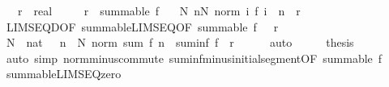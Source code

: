 \begin{isabellebody}
\ \ \ r\ {\isacharcolon}{\kern0pt}{\isacharcolon}{\kern0pt}\ real\isanewline
\ \ \ {\isachardoublequoteopen}{}\ {\isacharless}{\kern0pt}\ r{\isachardoublequoteclose}\ \ {\isachardoublequoteopen}summable\ f{\isachardoublequoteclose}\isanewline
\ \ \ {\isachardoublequoteopen}{\isasymexists}N{\isachardot}{\kern0pt}\ {\isasymforall}n{\isasymge}N{\isachardot}{\kern0pt}\ norm\ {\isacharparenleft}{\kern0pt}{\isasymSum}i{\isachardot}{\kern0pt}\ f\ {\isacharparenleft}{\kern0pt}i\ {\isacharplus}{\kern0pt}\ n{\isacharparenright}{\kern0pt}{\isacharparenright}{\kern0pt}\ {\isacharless}{\kern0pt}\ r{\isachardoublequoteclose}\isanewline
%
\isadelimproof
%
\endisadelimproof
%
\isatagproof
{}\isamarkupfalse%
\ {\isacharminus}{\kern0pt}\isanewline
\ \ \isamarkupfalse%
\ LIMSEQ{\isacharunderscore}{\kern0pt}D{\isacharbrackleft}{\kern0pt}OF\ summable{\isacharunderscore}{\kern0pt}LIMSEQ{\isacharbrackleft}{\kern0pt}OF\ {\isacartoucheopen}summable\ f{\isacartoucheclose}{\isacharbrackright}{\kern0pt}\ {\isacartoucheopen}{}\ {\isacharless}{\kern0pt}\ r{\isacartoucheclose}{\isacharbrackright}{\kern0pt}\isanewline
\ \ \isamarkupfalse%
\ N\ {\isacharcolon}{\kern0pt}{\isacharcolon}{\kern0pt}\ nat\ \ {\isachardoublequoteopen}{\isasymforall}\ n\ {\isasymge}\ N{\isachardot}{\kern0pt}\ norm\ {\isacharparenleft}{\kern0pt}sum\ f\ {\isacharbraceleft}{\kern0pt}{\isachardot}{\kern0pt}{\isachardot}{\kern0pt}{\isacharless}{\kern0pt}n{\isacharbraceright}{\kern0pt}\ {\isacharminus}{\kern0pt}\ suminf\ f{\isacharparenright}{\kern0pt}\ {\isacharless}{\kern0pt}\ r{\isachardoublequoteclose}\isanewline
\ \ \ \ \isamarkupfalse%
\ auto\isanewline
\ \ \isamarkupfalse%
\ \isamarkupfalse%
\ {\isacharquery}{\kern0pt}thesis\isanewline
\ \ \ \ \isamarkupfalse%
\ {\isacharparenleft}{\kern0pt}auto\ simp{\isacharcolon}{\kern0pt}\ norm{\isacharunderscore}{\kern0pt}minus{\isacharunderscore}{\kern0pt}commute\ suminf{\isacharunderscore}{\kern0pt}minus{\isacharunderscore}{\kern0pt}initial{\isacharunderscore}{\kern0pt}segment{\isacharbrackleft}{\kern0pt}OF\ {\isacartoucheopen}summable\ f{\isacartoucheclose}{\isacharbrackright}{\kern0pt}{\isacharparenright}{\kern0pt}\isanewline
{}\isamarkupfalse%
%
\endisatagproof
{\isafoldproof}%
%
\isadelimproof
\isanewline
%
\endisadelimproof
\isanewline
{}\isamarkupfalse%
\ summable{\isacharunderscore}{\kern0pt}LIMSEQ{\isacharunderscore}{\kern0pt}zero{\isacharcolon}{\kern0pt}\ \isanewline

\end{isabellebody}

